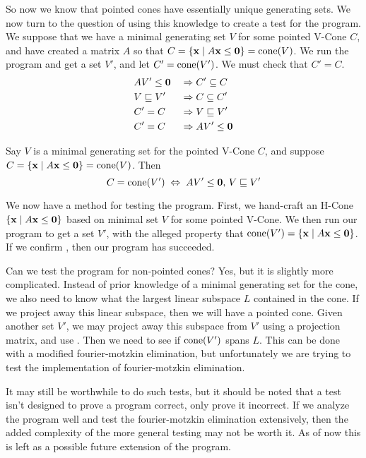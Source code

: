 So now we know that pointed cones have essentially unique generating sets.  We now turn to the question of using this knowledge to create a test for the program.  We suppose that we have a minimal generating set $V$ for some pointed V-Cone $C$, and have created a matrix $A$ so that $C = \left\{\mathbf{x}\;|\; A\mathbf{x}\leq\mathbf{0}\right\} = \operatorname{cone}(V)$.  We run the program and get a set $V'$, and let $C'=\operatorname{cone}(V')$.  We must check that $C' = C$.
\begin{alignat*}{2}
	 & AV'\leq\mathbf{0} \;        & \Rightarrow & \; C' \subseteq C   \\
	 & V \sqsubseteq V' \; & \Rightarrow & \; C \subseteq C'   \\
	 & C' = C \;           & \Rightarrow & \; V \sqsubseteq V' \\
	 & C' = C \;           & \Rightarrow & \; AV'\leq\mathbf{0}
\end{alignat*}

\begin{EqCriteria}\label{eq_hc_vc}
	Say $V$ is a minimal generating set for the pointed V-Cone $C$, and suppose $C = \left\{\mathbf{x}\;|\; A\mathbf{x}\leq\mathbf{0}\right\} = \operatorname{cone}(V)$.  Then
	\[ C = \operatorname{cone}(V') \;\Leftrightarrow\; AV'\leq\mathbf{0},\, V \sqsubseteq V' \]
\end{EqCriteria}

\begin{Test}\label{test_hc_to_vc}
	We now have a method for testing the program.  First, we hand-craft an H-Cone $\left\{\mathbf{x}\;|\; A\mathbf{x}\leq\mathbf{0}\right\}$ based on minimal set $V$ for some pointed V-Cone. We then run our program to get a set $V'$, with the alleged property that $\operatorname{cone}(V') = \left\{\mathbf{x}\;|\; A\mathbf{x}\leq\mathbf{0}\right\}$.  If we confirm , then our program has succeeded.
\end{Test}

\begin{Remark}
	Can we test the program for non-pointed cones?  Yes, but it is slightly more complicated.  Instead of prior knowledge of a minimal generating set for the cone, we also need to know what the largest linear subspace $L$ contained in the cone.  If we project away this linear subspace, then we will have a pointed cone.  Given another set $V'$, we may project away this subspace from $V'$ using a projection matrix, and use .  Then we need to see if $\operatorname{cone}(V')$ spans $L$.  This can be done with a modified fourier-motzkin elimination, but unfortunately we are trying to test the implementation of fourier-motzkin elimination.

	It may still be worthwhile to do such tests, but it should be noted that a test isn't designed to prove a program correct, only prove it incorrect.  If we analyze the program well and test the fourier-motzkin elimination extensively, then the added complexity of the more general testing may not be worth it.  As of now this is left as a possible future extension of the program.
\end{Remark}


